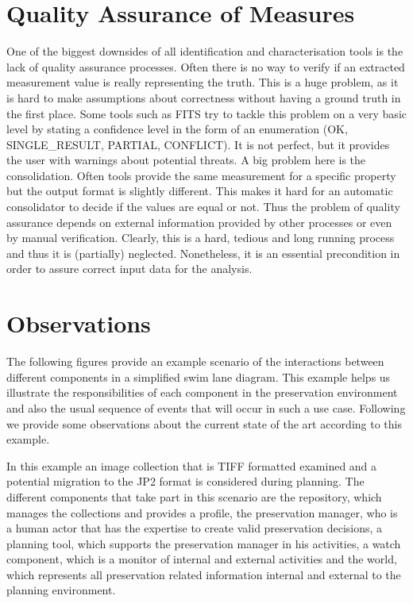 \section{Quality Assurance of Measures}
One of the biggest downsides of all identification and characterisation tools is the lack of quality assurance processes. Often there is no way to verify if an extracted measurement value is really representing the truth. This is a huge problem, as it is hard to make assumptions about correctness without having a ground truth in the first place.
Some tools such as FITS try to tackle this problem on a very basic level by stating a confidence level in the form of an enumeration (OK, SINGLE\_RESULT, PARTIAL, CONFLICT). It is not perfect, but it provides the user with warnings about potential threats.
A big problem here is the consolidation. Often tools provide the same measurement for a specific property but the output format is slightly different. This makes it hard for an automatic consolidator to decide if the values are equal or not. Thus the problem of quality assurance depends on external information provided by other processes or even by manual verification. 
Clearly, this is a hard, tedious and long running process and thus it is (partially) neglected.
Nonetheless, it is an essential precondition in order to assure correct input data for the analysis.

\section{Observations}
The following figures provide an example scenario of the interactions between different components in a simplified swim lane diagram. This example helps us illustrate the responsibilities of each component in the preservation environment and also the usual sequence of events that will occur in such a use case. Following we provide some observations about the current state of the art according to this example.

In this example an image collection that is TIFF formatted examined and a potential migration to the JP2 format is considered during planning. The different components that take part in this scenario are the repository, which manages the collections and provides a profile, the preservation manager, who is a human actor that has the expertise to create valid preservation decisions, a planning tool, which supports the preservation manager in his activities, a watch component, which is a monitor of internal and external activities and the world, which represents all preservation related information internal and external to the planning environment.


